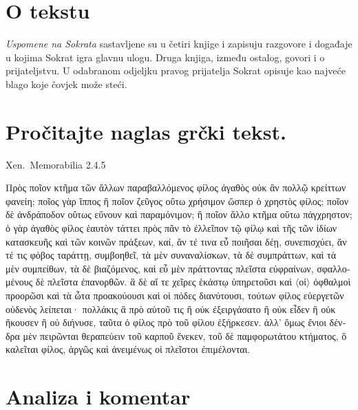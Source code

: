 

\section*{O tekstu}

\textit{Uspomene na Sokrata} sastavljene su u četiri knjige i zapisuju razgovore i događaje u kojima Sokrat igra glavnu ulogu. Druga knjiga, između ostalog, govori i o prijateljstvu. U odabranom odjeljku pravog prijatelja Sokrat opisuje kao najveće blago koje čovjek može steći.


\section*{Pročitajte naglas grčki tekst.}

Xen.\ Memorabilia 2.4.5


\medskip

\begin{greek}
{\large
{ \noindent Πρὸς ποῖον κτῆμα τῶν ἄλλων παραβαλλόμενος φίλος ἀγαθὸς οὐκ ἂν πολλῷ κρείττων φανείη; ποῖος γὰρ ἵππος ἢ ποῖον ζεῦγος οὕτω χρήσιμον ὥσπερ ὁ χρηστὸς φίλος; ποῖον δὲ ἀνδράποδον οὕτως εὔνουν καὶ παραμόνιμον; ἢ ποῖον ἄλλο κτῆμα οὕτω πάγχρηστον; ὁ γὰρ ἀγαθὸς φίλος ἑαυτὸν τάττει πρὸς πᾶν τὸ ἐλλεῖπον τῷ φίλῳ καὶ τῆς τῶν ἰδίων κατασκευῆς καὶ τῶν κοινῶν πράξεων, καί, ἄν τέ τινα εὖ ποιῆσαι δέῃ, συνεπισχύει, ἄν τέ τις φόβος ταράττῃ, συμβοηθεῖ, τὰ μὲν συναναλίσκων, τὰ δὲ συμπράττων, καὶ τὰ μὲν συμπείθων, τὰ δὲ βιαζόμενος, καὶ εὖ μὲν πράττοντας πλεῖστα εὐφραίνων, σφαλλομένους δὲ πλεῖστα ἐπανορθῶν. ἃ δὲ αἵ τε χεῖρες ἑκάστῳ ὑπηρετοῦσι καὶ $\langle$οἱ$\rangle$ ὀφθαλμοὶ προορῶσι καὶ τὰ ὦτα προακούουσι καὶ οἱ πόδες διανύτουσι, τούτων φίλος εὐεργετῶν οὐδενὸς λείπεται· πολλάκις ἃ πρὸ αὑτοῦ τις ἢ οὐκ ἐξειργάσατο ἢ οὐκ εἶδεν ἢ οὐκ ἤκουσεν ἢ οὐ διήνυσε, ταῦτα ὁ φίλος πρὸ τοῦ φίλου ἐξήρκεσεν. ἀλλ' ὅμως ἔνιοι δένδρα μὲν πειρῶνται θεραπεύειν τοῦ καρποῦ ἕνεκεν, τοῦ δὲ παμφορωτάτου κτήματος, ὃ καλεῖται φίλος, ἀργῶς καὶ ἀνειμένως οἱ πλεῖστοι ἐπιμέλονται.

}
}
\end{greek}

\section*{Analiza i komentar}

